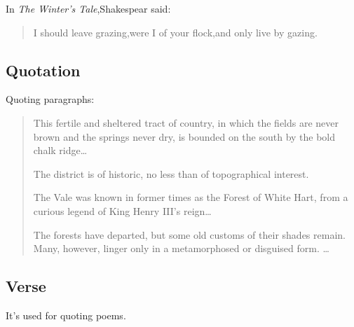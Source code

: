 In \emph{The Winter's Tale},Shakespear said:

\begin{quote}

I should leave grazing,were I of your flock,and only live by gazing.

\end{quote}

\subsection{Quotation}

Quoting paragraphs:

\begin{quotation}

This fertile and sheltered tract of country, in which the fields are
never brown and the springs never dry, is bounded on the south by
the bold chalk ridge\ldots

The district is of historic, no less than of topographical interest.

The Vale was known in former times as the Forest of White Hart, from
a curious legend of King Henry III's reign\ldots

The forests have departed, but some old customs of their shades
remain. Many, however, linger only in a metamorphosed or disguised
form. \ldots
\end{quotation}

\subsection{Verse}

It's used for quoting poems.

